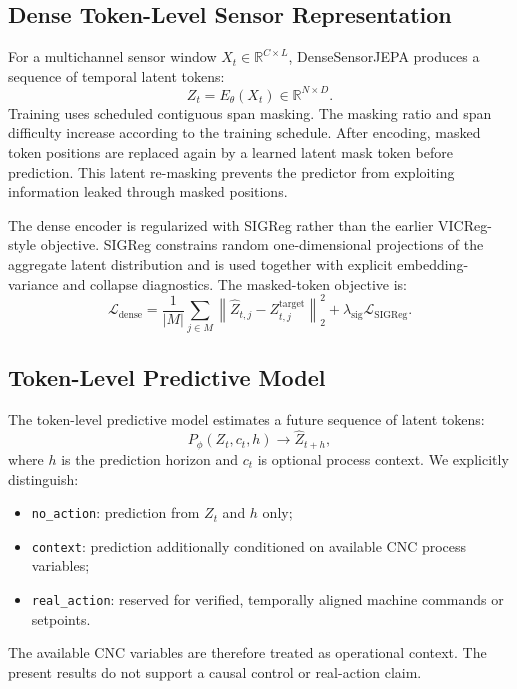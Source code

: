 \documentclass[10pt,journal,compsoc]{IEEEtran}
\begin{document}
\subsection{Dense Token-Level Sensor Representation}
For a multichannel sensor window $X_t \in \mathbb{R}^{C \times L}$, DenseSensorJEPA produces a sequence of temporal latent tokens:
\begin{equation}
    Z_t = E_\theta(X_t) \in \mathbb{R}^{N \times D}.
\end{equation}
Training uses scheduled contiguous span masking. The masking ratio and span difficulty increase according to the training schedule. After encoding, masked token positions are replaced again by a learned latent mask token before prediction. This latent re-masking prevents the predictor from exploiting information leaked through masked positions.

The dense encoder is regularized with SIGReg rather than the earlier VICReg-style objective. SIGReg constrains random one-dimensional projections of the aggregate latent distribution and is used together with explicit embedding-variance and collapse diagnostics. The masked-token objective is:
\begin{equation}
    \mathcal{L}_{\mathrm{dense}} =
    \frac{1}{|M|}\sum_{j \in M}
    \left\|\hat{Z}_{t,j}-Z^{\mathrm{target}}_{t,j}\right\|_2^2
    + \lambda_{\mathrm{sig}}\mathcal{L}_{\mathrm{SIGReg}}.
\end{equation}

\subsection{Token-Level Predictive Model}
The token-level predictive model estimates a future sequence of latent tokens:
\begin{equation}
    P_\phi(Z_t,c_t,h) \rightarrow \hat{Z}_{t+h},
\end{equation}
where $h$ is the prediction horizon and $c_t$ is optional process context. We explicitly distinguish:
\begin{itemize}
    \item \texttt{no\_action}: prediction from $Z_t$ and $h$ only;
    \item \texttt{context}: prediction additionally conditioned on available CNC process variables;
    \item \texttt{real\_action}: reserved for verified, temporally aligned machine commands or setpoints.
\end{itemize}
The available CNC variables are therefore treated as operational context. The present results do not support a causal control or real-action claim.
\end{document}
